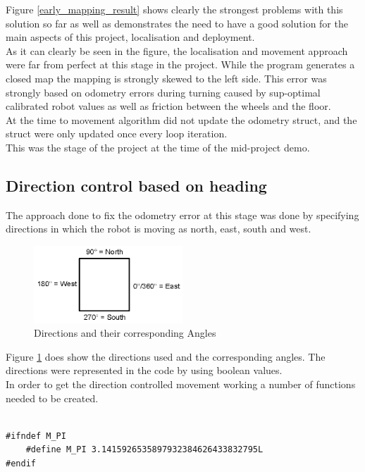 \begin{flushleft}
Figure \ref{early_mapping_result} shows clearly the strongest problems with this solution so far as well as demonstrates the need to have a good solution for  the main aspects of this project, localisation and deployment.\\
As it can clearly be seen in the figure, the localisation and movement approach were far from perfect at this stage in the project. 
While the program generates a closed  map the mapping is strongly skewed to the left side. This error was strongly based on odometry errors during turning caused by sup-optimal calibrated robot values as well as friction between the wheels and the floor.\\
At the time to movement algorithm did not update the odometry struct, and the struct were only updated once every loop iteration. \\
This was the stage of the project at the time of the mid-project demo.


\subsection{Direction control based on heading}
The approach done to fix the odometry error at this stage was done by specifying directions in which the robot is moving as north, east, south and west. 

\begin{figure}[h]
\centering
\includegraphics[width = 0.5\textwidth]{../../figures/direction_and_angles} 
\caption{Directions and their corresponding Angles}
\label{directions_and_angles}
\end{figure}

Figure \ref{directions_and_angles} does show the directions used and the corresponding angles. The directions were represented in the code by using boolean values. \\
In order to get the direction controlled movement working a number of functions needed to be created.  

\begin{lstlisting}[caption={Converting Radians to degrees}]

#ifndef M_PI
	#define M_PI 3.1415926535897932384626433832795L
#endif


\end{lstlisting}
\end{flushleft}
